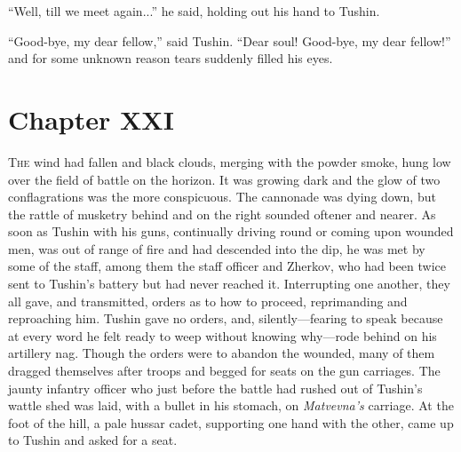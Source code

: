 ``Well, till we meet again...'' he said, holding out his hand to
Tushin.

``Good-bye, my dear fellow,'' said Tushin. ``Dear soul! Good-bye,
my dear fellow!'' and for some unknown reason tears suddenly
filled his eyes.


\chapter*{Chapter XXI}
\ifaudio     {} \fi

\lettrine[lines=2, loversize=0.3, lraise=0]{\initfamily T}{he}
wind had fallen and black clouds, merging with the powder
smoke, hung low over the field of battle on the horizon. It was
growing dark and the glow of two conflagrations was the more
conspicuous. The cannonade was dying down, but the rattle of
musketry behind and on the right sounded oftener and nearer. As
soon as Tushin with his guns, continually driving round or coming
upon wounded men, was out of range of fire and had descended into
the dip, he was met by some of the staff, among them the staff
officer and Zherkov, who had been twice sent to Tushin's battery
but had never reached it. Interrupting one another, they all
gave, and transmitted, orders as to how to proceed, reprimanding
and reproaching him. Tushin gave no orders, and,
silently---fearing to speak because at every word he felt ready
to weep without knowing why---rode behind on his artillery
nag. Though the orders were to abandon the wounded, many of them
dragged themselves after troops and begged for seats on the gun
carriages. The jaunty infantry officer who just before the battle
had rushed out of Tushin's wattle shed was laid, with a bullet in
his stomach, on \emph{Matvevna's} carriage. At the foot of the
hill, a pale hussar cadet, supporting one hand with the other,
came up to Tushin and asked for a seat.


